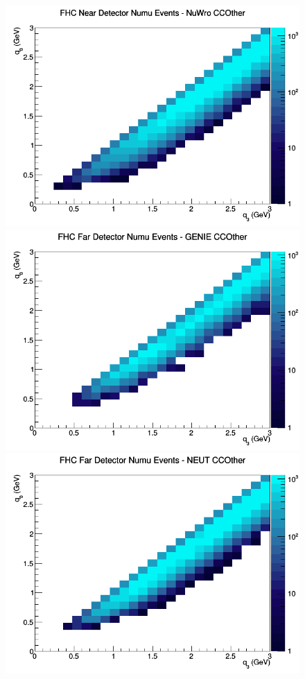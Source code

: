 \begin{figure}[h]
\includegraphics[width=\linewidth]{q0_q3/nominal/CCOther_FHC_ND_numu_q3_q0_NuWro.png}
\endminipage
\newline
{}
\includegraphics[width=\linewidth]{q0_q3/nominal/CCOther_FHC_FD_numu_q3_q0_GENIE.png}
\endminipage
{}
\includegraphics[width=\linewidth]{q0_q3/nominal/CCOther_FHC_FD_numu_q3_q0_NEUT.png}

\end{figure}

